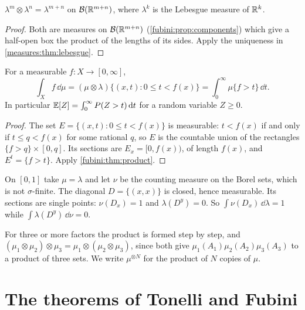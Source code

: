 \begin{notechapter}
\begin{corollary}\label{fubini:cor:lebesgue}
$\lambda^m\otimes\lambda^n = \lambda^{m+n}$ on
$\mathcal B(\mathbb{R}^{m+n})$, where $\lambda^k$ is the Lebesgue measure of
$\mathbb{R}^k$.
\end{corollary}

\begin{proof}
Both are measures on $\mathcal B(\mathbb{R}^{m+n})$
(\cref{fubini:prop:components}) which give a half-open box the product
of the lengths of its sides. Apply the uniqueness in
\cref{measures:thm:lebesgue}.
\end{proof}

\begin{proposition}
\label{fubini:prop:layer}
For a measurable $f:X\to[0, \infty]$,
\[
  \int_Xf\,\dd\mu
  = (\mu\otimes\lambda)\bigl\{(x, t) : 0\leq t < f(x)\bigr\}
  = \int_0^\infty\mu\{f > t\}\,\dd t .
\]
In particular $\mathbb{E}[Z] = \int_0^\infty P(Z > t)\,\mathrm{d} t$ for a random
variable $Z\geq0$.
\end{proposition}

\begin{proof}
The set $E = \{(x, t) : 0\leq t < f(x)\}$ is measurable: $t < f(x)$ if
and only if $t\leq q < f(x)$ for some rational $q$, so $E$ is the
countable union of the rectangles $\{f > q\}\times[0, q]$. Its sections
are $E_x = [0, f(x))$, of length $f(x)$, and $E^t = \{f > t\}$. Apply
\cref{fubini:thm:product}.
\end{proof}

\begin{pitfall}
On $[0, 1]$ take $\mu = \lambda$ and let $\nu$ be the counting measure
on the Borel sets, which is not $\sigma$-finite. The diagonal
$D = \{(x, x)\}$ is closed, hence measurable. Its sections are single
points: $\nu(D_x) = 1$ and $\lambda(D^y) = 0$. So
$\int\nu(D_x)\,\dd\lambda = 1$ while $\int\lambda(D^y)\,\dd\nu = 0$.
\end{pitfall}

For three or more factors the product is formed step by step, and
$(\mu_1\otimes\mu_2)\otimes\mu_3 = \mu_1\otimes(\mu_2\otimes\mu_3)$,
since both give $\mu_1(A_1)\mu_2(A_2)\mu_3(A_3)$ to a product of three
sets. We write $\mu^{\otimes N}$ for the product of $N$ copies of $\mu$.

\section{The theorems of Tonelli and Fubini}\label{fubini:sec:theorems}


\end{notechapter}
